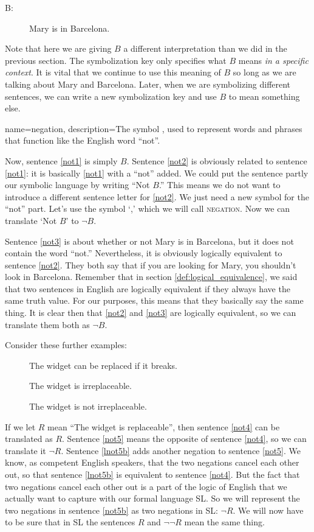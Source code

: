 \begin{description}
\item[B:]Mary is in Barcelona.
\end{description}

Note that here we are giving $B$ a different interpretation than we did in the previous section. The symbolization key only specifies what $B$ means \emph{in a specific context}. It is vital that we continue to use this meaning of $B$ so long as we are talking about Mary and Barcelona. Later, when we are symbolizing different sentences, we can write a new symbolization key and use $B$ to mean something else.

{
name=negation,
description={The symbol \lnot, used to represent words and phrases that function like the English word ``not''.}
}

Now, sentence \ref{not1} is simply $B$. Sentence \ref{not2} is obviously related to sentence \ref{not1}: it is basically \ref{not1} with a ``not'' added. We could put the sentence partly our symbolic language by writing ``Not $B$.'' This means we do not want to introduce a different sentence letter for \ref{not2}. We just need a new symbol for the ``not'' part. Let's use the symbol `\lnot,' which we will call \textsc{\gls{negation}}. \label{def:negation} Now we can translate `Not $B$' to $\lnot B$.

Sentence \ref{not3} is about whether or not Mary is in Barcelona, but it does not contain the word ``not.'' Nevertheless, it is obviously logically equivalent to sentence \ref{not2}. They both say that if you are looking for Mary, you shouldn't look in Barcelona. Remember that in section \ref{def:logical_equivalence}, we said that two sentences in English are logically equivalent if they always have the same truth value. For our purposes, this means that they basically say the same thing. It is clear then that \ref{not2} and \ref{not3} are logically equivalent, so we can translate them both as $\lnot B$.

Consider these further examples:
\begin{description}
\item[] The widget can be replaced if it breaks.
\item[] The widget is irreplaceable.
\item[] The widget is not irreplaceable.
\end{description}

If we let $R$ mean ``The widget is replaceable'', then sentence \ref{not4} can be translated as $R$. Sentence \ref{not5} means the opposite of sentence \ref{not4}, so we can translate it $\lnot R$. Sentence \ref{lnot5b} adds another negation to sentence \ref{not5}. We know, as competent English speakers, that the two negations cancel each other out, so that sentence \ref{lnot5b} is equivalent to sentence \ref{not4}. But the fact that two negations cancel each other out is a part of the logic of English that we actually want to capture with our formal language SL.
So we will represent the two negations in sentence \ref{not5b} as two negations in SL: $\lnot $\lnot$ R$. We will now have to be sure that in SL the sentences $R$ and $\lnot \lnot R$ mean the same thing.

